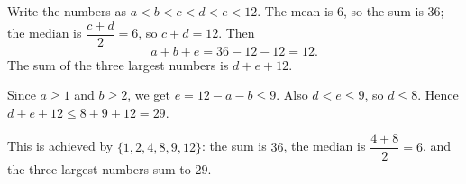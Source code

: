 Write the numbers as $a<b<c<d<e<12$. The mean is $6$, so the sum is $36$; the median is $\dfrac{c+d}{2}=6$, so $c+d=12$. Then
\[
a+b+e=36-12-12=12 .
\]
The sum of the three largest numbers is $d+e+12$.

Since $a\ge1$ and $b\ge2$, we get $e=12-a-b\le9$. Also $d<e\le9$, so $d\le8$. Hence $d+e+12\le8+9+12=29$.

This is achieved by $\{1,2,4,8,9,12\}$: the sum is $36$, the median is $\dfrac{4+8}{2}=6$, and the three largest numbers sum to $\boxed{29}$.
